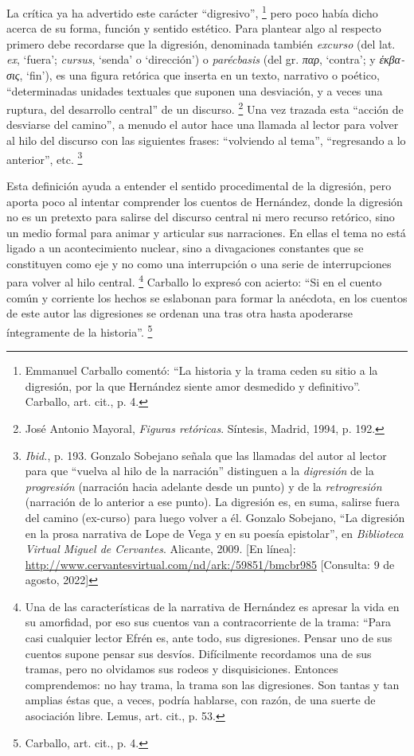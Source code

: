 \documentclass[14pt,twoside,final]{extbook} %
\let\oldfootnote\footnote
\renewcommand\footnote[1]{%
\oldfootnote{\hspace{1mm}#1}}
\begin{document}
La crítica ya ha advertido este carácter ``digresivo'',\footnote{Emmanuel Carballo comentó: ``La historia y la trama ceden su sitio a la digresión, por la que Hernández siente amor desmedido y definitivo''. Carballo, art. cit., p. 4.} pero poco había dicho acerca de su forma, función y sentido estético. Para plantear algo al respecto primero debe recordarse que la digresión, denominada
también \emph{excurso} (del lat. \emph{ex}, `fuera'; \emph{cursus}, `senda' o `dirección') o \emph{parécbasis} (del gr. \textgreek{\itshape παρ}, `contra'; y \textgreek{\itshape έκβασις}, `fin'), es una figura retórica que inserta en un texto, narrativo o poético, ``determinadas unidades textuales que suponen una desviación, y a veces una ruptura, del desarrollo central'' de un discurso.\footnote{José Antonio Mayoral, \emph{Figuras retóricas}. Síntesis, Madrid, 1994, p. 192.} Una vez trazada esta ``acción de desviarse del camino'', a menudo el autor hace una llamada al lector para volver al hilo del discurso con las siguientes frases: ``volviendo al tema'',
``regresando a lo anterior'', etc.\footnote{\emph{Ibid.}, p. 193. Gonzalo Sobejano señala que las llamadas del autor al lector para que ``vuelva al hilo de la narración'' distinguen a la \emph{digresión} de la \emph{progresión} (narración hacia adelante desde un punto) y de la \emph{retrogresión} (narración de lo anterior a ese punto). La digresión es, en suma, salirse fuera del camino (ex-curso) para luego volver a él. Gonzalo Sobejano, ``La digresión en la prosa narrativa de Lope de Vega y en su poesía epistolar'', en \emph{Biblioteca Virtual Miguel de Cervantes}. Alicante, 2009. [En línea]: \url{http://www.cervantesvirtual.com/nd/ark:/59851/bmcbr985} [Consulta: 9 de agosto, 2022]}

Esta definición ayuda a entender el sentido procedimental de la digresión, pero aporta poco al intentar comprender los cuentos de Hernández, donde la digresión no es un pretexto para salirse del
discurso central ni mero recurso retórico, sino un medio formal para animar y articular sus narraciones. En ellas el tema no está ligado a un acontecimiento nuclear, sino a divagaciones constantes que se constituyen como eje y no como una interrupción o una serie de interrupciones para volver al hilo central.\footnote{Una de las características de la narrativa de Hernández es apresar la vida en su amorfidad, por eso sus cuentos van a contracorriente de la trama: ``Para casi cualquier lector Efrén es, ante todo, sus digresiones. Pensar uno de sus cuentos supone pensar sus desvíos. Difícilmente recordamos una de sus tramas, pero no olvidamos sus rodeos y disquisiciones. Entonces comprendemos: no hay trama, la trama son las digresiones. Son tantas y tan amplias éstas que, a veces, podría hablarse, con razón, de una suerte de asociación libre. Lemus, art. cit., p. 53.} Carballo lo expresó con acierto: ``Si en el cuento común y corriente los hechos se eslabonan para formar la anécdota, en los cuentos de este autor las digresiones se ordenan una tras otra hasta apoderarse íntegramente de la historia''.\footnote{Carballo, art. cit., p. 4.}
\end{document}
